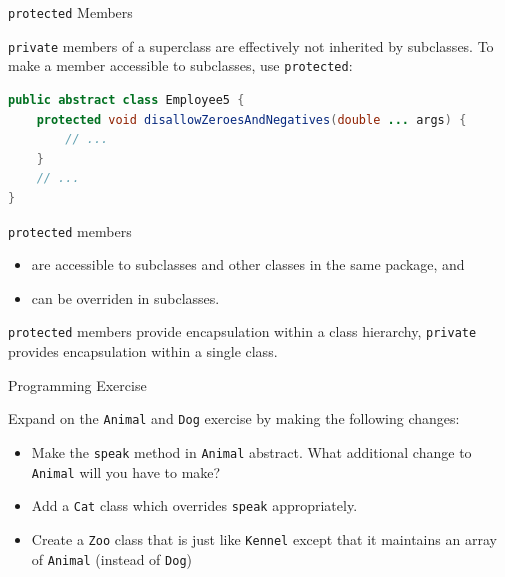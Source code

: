 \documentclass{beamer}
\begin{document}


\begin{frame}[fragile]{{\tt protected} Members}


{\tt private} members of a superclass are effectively not inherited by subclasses.  To make a member accessible to subclasses, use {\tt protected}:
\begin{lstlisting}[language=Java]
public abstract class Employee5 {
    protected void disallowZeroesAndNegatives(double ... args) {
        // ...
    }
    // ...
}
\end{lstlisting}
{\tt protected} members
\begin{itemize}
\item are accessible to subclasses and other classes in the same package, and
\item can be overriden in subclasses.
\end{itemize}
{\tt protected} members provide encapsulation within a class hierarchy, {\tt private} provides encapsulation within a single class.

\end{frame}

\begin{frame}[fragile]{Programming Exercise}


Expand on the {\tt Animal} and {\tt Dog} exercise by making the following changes:
\begin{itemize}
\item Make the {\tt speak} method in {\tt Animal} abstract.  What additional change to {\tt Animal} will you have to make?
\item Add a {\tt Cat} class which overrides {\tt speak} appropriately.
\item Create a {\tt Zoo} class that is just like {\tt Kennel} except that it
 maintains an array of {\tt Animal} (instead of {\tt Dog})
\end{itemize}


\end{frame}








\end{document}
